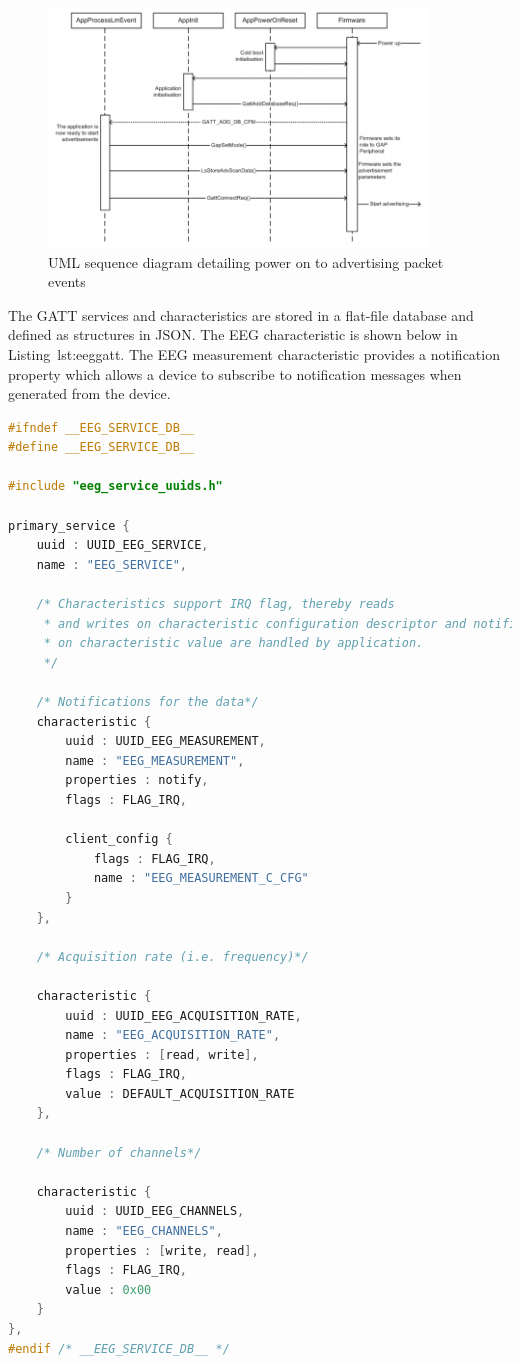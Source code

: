 \documentclass[]{article}
\begin{document}
\begin{figure}[htb]
	\begin{center}
		\includegraphics[width = 0.9\textwidth]{uml}
	\end{center}
	\caption{UML sequence diagram detailing power on to advertising packet events \cite{firmwaredev}}
	\label{fig:umlseq}
\end{figure}


The \ac{GATT} services and characteristics are stored in a flat-file database and defined as structures in JSON. The EEG characteristic is shown below in Listing~{lst:eeggatt}. The EEG measurement characteristic provides a notification property which allows a device to subscribe to notification messages when generated from the device.

\begin{lstlisting}[language=C, caption=GATT database entry for EEG characteristic,label={lst:eeggatt}]
#ifndef __EEG_SERVICE_DB__
#define __EEG_SERVICE_DB__

#include "eeg_service_uuids.h"

primary_service {
    uuid : UUID_EEG_SERVICE,
    name : "EEG_SERVICE",

    /* Characteristics support IRQ flag, thereby reads 
     * and writes on characteristic configuration descriptor and notifications 
     * on characteristic value are handled by application. 
     */

    /* Notifications for the data*/
    characteristic {
        uuid : UUID_EEG_MEASUREMENT,
        name : "EEG_MEASUREMENT",
        properties : notify,
        flags : FLAG_IRQ,

        client_config {
            flags : FLAG_IRQ,
            name : "EEG_MEASUREMENT_C_CFG"
        }
    },

    /* Acquisition rate (i.e. frequency)*/

    characteristic {
        uuid : UUID_EEG_ACQUISITION_RATE,
        name : "EEG_ACQUISITION_RATE",
        properties : [read, write],
        flags : FLAG_IRQ,
        value : DEFAULT_ACQUISITION_RATE
    },

    /* Number of channels*/

    characteristic {
        uuid : UUID_EEG_CHANNELS,
        name : "EEG_CHANNELS",
        properties : [write, read],
        flags : FLAG_IRQ,
        value : 0x00
    }
},
#endif /* __EEG_SERVICE_DB__ */
\end{lstlisting}
\end{document}
